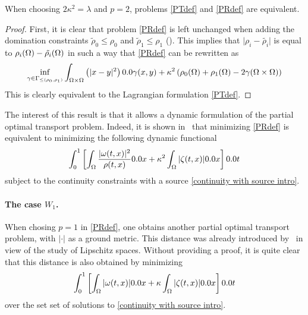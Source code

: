 \begin{proposition}
When choosing $2\kappa^2=\lambda$ and $p=2$, problems \eqref{PTdef} and \eqref{PRdef} are equivalent.
\end{proposition}

\begin{proof}
First, it is clear that problem \eqref{PRdef} is left unchanged when adding the domination constraints $\tilde{\rho}_0\leq \rho_0$ and $\tilde{\rho}_1\leq \rho_1$ (\cite[Proposition 4]{piccoli2013properties}). This implies that $\vert \rho_i-\tilde{\rho_i}\vert$ is equal to $\rho_i(\Omega)-\tilde{\rho_i}(\Omega)$ in such a way that \eqref{PRdef} can be rewritten as
\[
\inf_{\gamma \in \Gamma_{\leq(\rho_0,\rho_1)}} \int_{\Om \times \Om} \left( \vert x-y\vert^2 \right) \d\gamma (x,y) +
\kappa^2
\left(  \rho_0(\Om)+\rho_1(\Om)-2\gamma(\Om\times \Om )\right)
\]
This is clearly equivalent to the Lagrangian formulation \eqref{PTdef}.
\end{proof}

The interest of this result is that it allows a dynamic formulation of the partial optimal transport problem. Indeed, it is shown in~\cite{piccoli2013properties} that minimizing \eqref{PRdef} is equivalent to minimizing the following dynamic functional
\begin{equation}
\label{dynamic PT}
\int_0^1 \left[ \int_{\Om} \frac{|\M(t,x)|^2}{\rho(t,x)} \d x + \kappa^2 \int_{\Om} |\Z(t,x)| \d x \right] \d t
\end{equation}
subject to the continuity constraints with a source \eqref{continuity with source intro}.

\paragraph{The case $W_1$.}

When chosing $p=1$ in \eqref{PRdef}, one obtains another partial optimal transport problem, with $|\cdot|$ as a ground metric. This distance was already introduced by~\cite{hanin1992kantorovich} in view of the study of Lipschitz spaces. Without providing a proof, it is quite clear that this distance is also obtained by minimizing
\begin{equation}
\int_0^1 \left[ \int_{\Om} |\M(t,x)| \d x + \kappa \int_{\Om} |\Z(t,x)| \d x \right] \d t
\label{eq: Hanin KR}
\end{equation}
over the set set of solutions to \eqref{continuity with source intro}.

